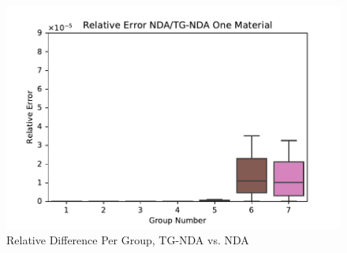 \begin{figure}[H]
    \centering
    \includegraphics[width=.75\textwidth]{fig/OneMatErr.pdf}
    \caption{Relative Difference Per Group, TG-NDA vs. NDA}
    \label{fig:OneMatErr}
\end{figure}

